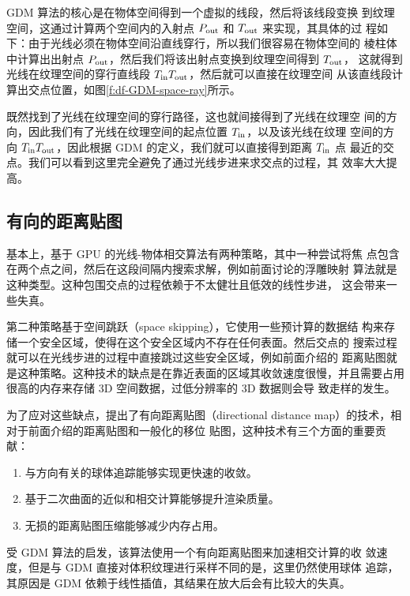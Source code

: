 GDM 算法的核心是在物体空间得到一个虚拟的线段，然后将该线段变换 到纹理空间，这通过计算两个空间内的入射点 $P_{\rm out}$ 和 $T_{\rm out}$ 来实现，其具体的过 程如下：由于光线必须在物体空间沿直线穿行，所以我们很容易在物体空间的 棱柱体中计算出出射点 $P_{\rm out}$，然后我们将该出射点变换到纹理空间得到 $T_{\rm out}$， 这就得到光线在纹理空间的穿行直线段 $T_{\rm in}T_{\rm out}$，然后就可以直接在纹理空间 从该直线段计算出交点位置，如图\ref{f:df-GDM-space-ray}所示。

既然找到了光线在纹理空间的穿行路径，这也就间接得到了光线在纹理空 间的方向，因此我们有了光线在纹理空间的起点位置 $T_{\rm in}$，以及该光线在纹理 空间的方向 $T_{\rm in}T_{\rm out}$，因此根据 GDM 的定义，我们就可以直接得到距离 $T_{\rm in}$ 点 最近的交点。我们可以看到这里完全避免了通过光线步进来求交点的过程，其 效率大大提高。




\subsection{有向的距离贴图}
基本上，基于 GPU 的光线-物体相交算法有两种策略，其中一种尝试将焦 点包含在两个点之间，然后在这段间隔内搜索求解，例如前面讨论的浮雕映射 算法就是这种类型。这种包围交点的过程依赖于不太健壮且低效的线性步进， 这会带来一些失真。

第二种策略基于空间跳跃（space skipping），它使用一些预计算的数据结 构来存储一个安全区域，使得在这个安全区域内不存在任何表面。然后交点的 搜索过程就可以在光线步进的过程中直接跳过这些安全区域，例如前面介绍的 距离贴图就是这种策略。这种技术的缺点是在靠近表面的区域其收敛速度很慢，并且需要占用很高的内存来存储 3D 空间数据，过低分辨率的 3D 数据则会导 致走样的发生。

为了应对这些缺点，\cite{a:directional-distance-maps}提出了有向距离贴图（directional distance map）的技术，相对于前面介绍的距离贴图和一般化的移位 贴图，这种技术有三个方面的重要贡献：

\begin{enumerate}
	\item 与方向有关的球体追踪能够实现更快速的收敛。
	\item 基于二次曲面的近似和相交计算能够提升渲染质量。 
	\item 无损的距离贴图压缩能够减少内存占用。
\end{enumerate}

受 GDM 算法的启发，该算法使用一个有向距离贴图来加速相交计算的收 敛速度，但是与 GDM 直接对体积纹理进行采样不同的是，这里仍然使用球体 追踪，其原因是 GDM 依赖于线性插值，其结果在放大后会有比较大的失真。

